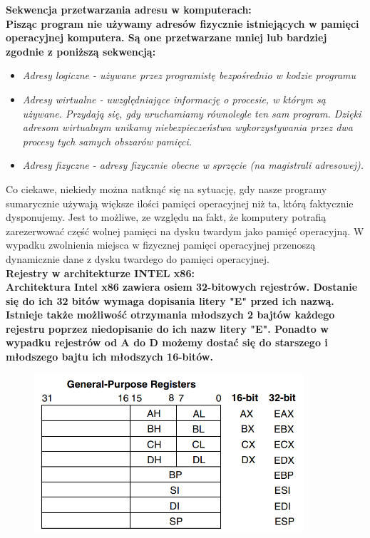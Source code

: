 \documentclass[a4paper,12pt]{article}
\newcommand{\h}[1]{\noindent \bf #1 \rm \\ \noindent}
\newcommand{\italic}[1]{\it #1 \rm}
\begin{document}
\h{Sekwencja przetwarzania adresu w komputerach:}
Pisząc program nie używamy adresów fizycznie istniejących w pamięci operacyjnej komputera. Są one przetwarzane mniej lub bardziej zgodnie z poniższą sekwencją:
\begin{itemize}
	\item \italic{Adresy logiczne} - używane przez programistę bezpośrednio w kodzie programu
	\item \italic{Adresy wirtualne} - uwzględniające informację o procesie, w którym są używane. Przydają się, gdy uruchamiamy równolegle ten sam program. Dzięki adresom wirtualnym unikamy niebezpieczeństwa wykorzystywania przez dwa procesy tych samych obszarów pamięci.
	\item \italic{Adresy fizyczne} - adresy fizycznie obecne w sprzęcie (na magistrali adresowej).
\end{itemize}
\vspace{5mm}

\noindent
Co ciekawe, niekiedy można natknąć się na sytuację, gdy nasze programy sumarycznie używają większe ilości pamięci operacyjnej niż ta, którą faktycznie dysponujemy. Jest to możliwe, ze względu na fakt, że komputery potrafią zarezerwować część wolnej pamięci na dysku twardym jako pamięć operacyjną. W wypadku zwolnienia miejsca w fizycznej pamięci operacyjnej przenoszą dynamicznie dane z dysku twardego do pamięci operacyjnej.\\

\h{Rejestry w architekturze INTEL x86:}
Architektura Intel x86 zawiera osiem 32-bitowych rejestrów. Dostanie się do ich 32 bitów wymaga dopisania litery "E" przed ich nazwą. Istnieje także możliwość otrzymania młodszych 2 bajtów każdego rejestru poprzez niedopisanie do ich nazw litery "E". Ponadto w wypadku rejestrów od A do D możemy dostać się do starszego i młodszego bajtu ich młodszych 16-bitów.

\begin{figure}[H]
	\centering
	\includegraphics[width=10cm]{fig1.png}
\end{figure}
\end{document}

